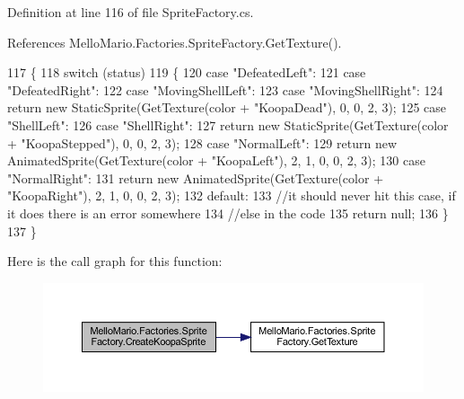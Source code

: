 Definition at line 116 of file Sprite\+Factory.\+cs.



References Mello\+Mario.\+Factories.\+Sprite\+Factory.\+Get\+Texture().


\begin{DoxyCode}
117         \{
118             \textcolor{keywordflow}{switch} (status)
119             \{
120                 \textcolor{keywordflow}{case} \textcolor{stringliteral}{"DefeatedLeft"}:
121                 \textcolor{keywordflow}{case} \textcolor{stringliteral}{"DefeatedRight"}:
122                 \textcolor{keywordflow}{case} \textcolor{stringliteral}{"MovingShellLeft"}:
123                 \textcolor{keywordflow}{case} \textcolor{stringliteral}{"MovingShellRight"}:
124                     \textcolor{keywordflow}{return} \textcolor{keyword}{new} StaticSprite(GetTexture(color + \textcolor{stringliteral}{"KoopaDead"}), 0, 0, 2, 3);
125                 \textcolor{keywordflow}{case} \textcolor{stringliteral}{"ShellLeft"}:
126                 \textcolor{keywordflow}{case} \textcolor{stringliteral}{"ShellRight"}:
127                     \textcolor{keywordflow}{return} \textcolor{keyword}{new} StaticSprite(GetTexture(color + \textcolor{stringliteral}{"KoopaStepped"}), 0, 0, 2, 3);
128                 \textcolor{keywordflow}{case} \textcolor{stringliteral}{"NormalLeft"}:
129                     \textcolor{keywordflow}{return} \textcolor{keyword}{new} AnimatedSprite(GetTexture(color + \textcolor{stringliteral}{"KoopaLeft"}), 2, 1, 0, 0, 2, 3);
130                 \textcolor{keywordflow}{case} \textcolor{stringliteral}{"NormalRight"}:
131                     \textcolor{keywordflow}{return} \textcolor{keyword}{new} AnimatedSprite(GetTexture(color + \textcolor{stringliteral}{"KoopaRight"}), 2, 1, 0, 0, 2, 3);
132                 \textcolor{keywordflow}{default}:
133                     \textcolor{comment}{//it should never hit this case, if it does there is an error somewhere}
134                     \textcolor{comment}{//else in the code}
135                     \textcolor{keywordflow}{return} null;
136             \}
137         \}
\end{DoxyCode}
Here is the call graph for this function\+:
\nopagebreak
\begin{figure}[H]
\begin{center}
\leavevmode
\includegraphics[width=350pt]{classMelloMario_1_1Factories_1_1SpriteFactory_ae82ad2af40dfed81f46240657130d686_cgraph}
\end{center}
\end{figure}

